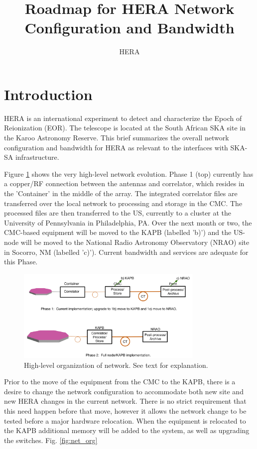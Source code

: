 \documentclass{article}
\begin{document}
\author{HERA}
\title{Roadmap for HERA Network Configuration and Bandwidth}
\maketitle

\section{Introduction}
HERA is an international experiment to detect and characterize the Epoch of Reionization (EOR).  The telescope is located at the South African SKA site in the Karoo
Astronomy Reserve.  This brief summarizes the overall network configuration and bandwidth for HERA as relevant to the interfaces with SKA-SA infrastructure.

Figure \ref{fig:hi_level} shows the very high-level network evolution.  Phase 1 (top) currently has a copper/RF connection between the antennas and correlator, which resides in the 'Container' in the middle of the array.  The integrated correlator files are transferred over the local network to processing and storage in the CMC.  The processed files are then transferred to the US, currently to a cluster at the University of Pennsylvania in Philadelphia, PA.  Over the next month or two, the CMC-based equipment will be moved to the KAPB (labelled 'b)') and the US-node will be moved to the National Radio Astronomy Observatory (NRAO) site in Socorro, NM (labelled 'c)').  Current bandwidth and services are adequate for this Phase.

\begin{figure}[H]
\includegraphics[width=0.8\textwidth]{network.png}
\centering
\caption{High-level organization of network.  See text for explanation.}
\label{fig:hi_level}
\end{figure}

Prior to the move of the equipment from the CMC to the KAPB, there is a desire to change the network configuration to accommodate both new site and new HERA changes in the current network.  There is no strict requirement that this need happen before that move, however it allows the network change to be tested before a major hardware relocation.  When the equipment is relocated to the KAPB additional memory will be added to the system, as well as upgrading the switches.  Fig. \ref{fig:net_org} 
\end{document}
